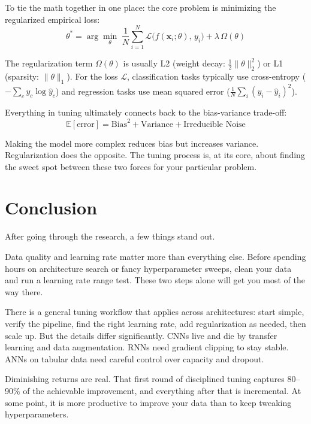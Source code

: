 \documentclass[12pt, letterpaper]{article}
\begin{document}
To tie the math together in one place: the core problem is minimizing the regularized empirical loss:
\begin{equation}
    \theta^* = \arg\min_\theta \; \frac{1}{N} \sum_{i=1}^{N} \mathcal{L}\bigl(f(\mathbf{x}_i; \theta),\, y_i\bigr) + \lambda\,\Omega(\theta)
\end{equation}

The regularization term $\Omega(\theta)$ is usually L2 (weight decay: $\frac{1}{2}\|\theta\|_2^2$) or L1 (sparsity: $\|\theta\|_1$). For the loss $\mathcal{L}$, classification tasks typically use cross-entropy ($-\sum_c y_c \log \hat{y}_c$) and regression tasks use mean squared error ($\frac{1}{N}\sum_i (y_i - \hat{y}_i)^2$).

Everything in tuning ultimately connects back to the bias-variance trade-off:
\begin{equation}
    \mathbb{E}[\text{error}] = \text{Bias}^2 + \text{Variance} + \text{Irreducible Noise}
\end{equation}

Making the model more complex reduces bias but increases variance. Regularization does the opposite. The tuning process is, at its core, about finding the sweet spot between these two forces for your particular problem.

\newpage
\section{Conclusion}

After going through the research, a few things stand out.

Data quality and learning rate matter more than everything else. Before spending hours on architecture search or fancy hyperparameter sweeps, clean your data and run a learning rate range test. These two steps alone will get you most of the way there.

There is a general tuning workflow that applies across architectures: start simple, verify the pipeline, find the right learning rate, add regularization as needed, then scale up. But the details differ significantly. CNNs live and die by transfer learning and data augmentation. RNNs need gradient clipping to stay stable. ANNs on tabular data need careful control over capacity and dropout.

Diminishing returns are real. That first round of disciplined tuning captures 80--90\% of the achievable improvement, and everything after that is incremental. At some point, it is more productive to improve your data than to keep tweaking hyperparameters.
\end{document}
